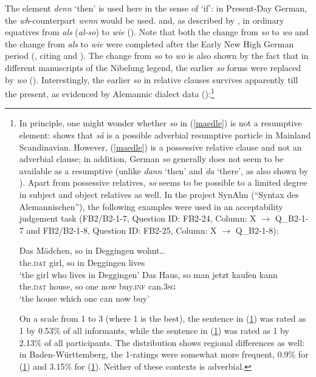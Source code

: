 {The element \textit{denn} `then' is used here in the sense of `if': in Present-Day German, the \textit{wh}-counterpart \textit{wenn} would be used.} and, as described by \citet{jaeger2010}, in ordinary equatives from \textit{als} (\textit{al-so}) to \textit{wie} (\citealt[154--156]{brandnerbraeuning2013}). Note that both the change from \textit{so} to \textit{wo} and the change from \textit{als} to \textit{wie} were completed after the Early New High German period (\citealt[154]{brandnerbraeuning2013}, citing \citealt{jaeger2010} and \citealt{behaghel1928}). The change from \textit{so} to \textit{wo} is also shown by the fact that in different manuscripts of the Nibelung legend, the earlier \textit{so} forms were replaced by \textit{wo} (\citealt[155--156]{brandnerbraeuning2013}). Interestingly, the earlier \textit{so} in relative clauses survives apparently till the present, as evidenced by Alemannic dialect data (\citealt[154, ex. 53a]{brandnerbraeuning2013}):\footnote{In principle, one might wonder whether \textit{so} in (\ref{maedle}) is not a resumptive element: \citet{meklenborgsalvesen2020} shows that \textit{så} is a possible adverbial resumptive particle in Mainland Scandinavian. However, (\ref{maedle}) is a possessive relative clause and not an adverbial clause; in addition, German \textit{so} generally does not seem to be available as a resumptive (unlike \textit{dann} `then' and \textit{da} `there', as also shown by \citealt{meklenborgsalvesen2020}). Apart from possessive relatives, \textit{so} seems to be possible to a limited degree in subject and object relatives as well. In the project SynAlm (``Syntax des Alemannischen''), the following examples were used in an acceptability judgement task (FB2/B2-1-7, Question ID: FB2-24, Column: X $\rightarrow$ Q\_B2-1-7 and FB2/B2-1-8, Question ID: FB2-25, Column: X $\rightarrow$ Q\_B2-1-8):

\ea \gll Das Mädchen, so in Deggingen wohnt\ldots \label{sosubject}\\
the.\textsc{dat} girl, so in Deggingen lives\\
\glt `the girl who lives in Deggingen'
\ex \gll Das Haus, so man jetzt kaufen kann \label{soobject}\\
the.\textsc{dat} house, so one now buy.\textsc{inf} can.\textsc{3sg}\\
\glt `the house which one can now buy'
\z

On a scale from 1 to 3 (where 1 is the best), the sentence in (\ref{sosubject}) was rated as 1 by 0.53\% of all informants, while the sentence in (\ref{soobject}) was rated as 1 by 2.13\% of all participants. The distribution shows regional differences as well: in Baden-Württemberg, the 1-ratings were somewhat more frequent, 0.9\% for (\ref{sosubject}) and 3.15\% for (\ref{soobject}). Neither of these contexts is adverbial.}

